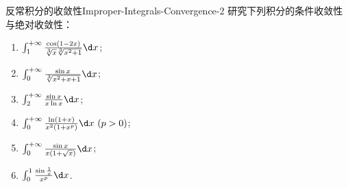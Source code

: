 \begin{problem}{反常积分的收敛性}{Improper-Integrals-Convergence-2}
    研究下列积分的条件收敛性与绝对收敛性：
    \begin{enumerate}
        \item $\int_1^{+\infty} \frac{\cos(1 - 2x)}{\sqrt[3]{x} \sqrt[3]{x^2 + 1}} \d x$;
        \item $\int_0^{+\infty} \frac{\sin x}{\sqrt[3]{x^2 + x + 1}} \d x$;
        \item $\int_2^{+\infty} \frac{\sin x}{x \ln x} \d x$;
        \item $\int_0^{+\infty} \frac{\ln(1 + x)}{x^2(1 + x^p)} \d x \ (p > 0)$;
        \item $\int_0^{+\infty} \frac{\sin x}{x(1 + \sqrt{x})} \d x$;
        \item $\int_0^1 \frac{\sin \frac{1}{x}}{x^p} \d x$.
    \end{enumerate}
\end{problem}

